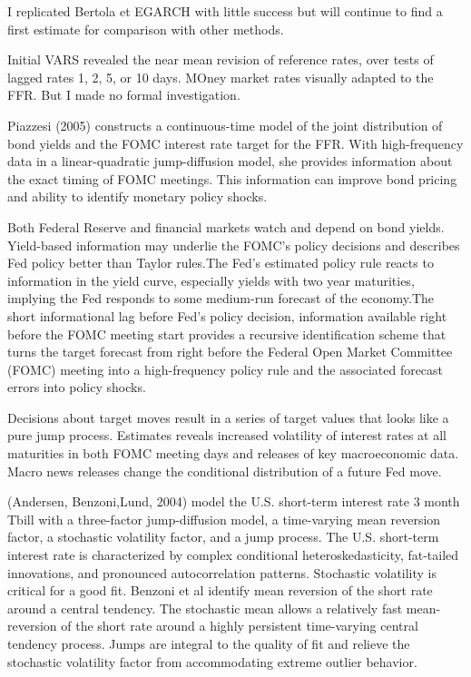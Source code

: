 \documentclass[
]{article}
\begin{document}
I replicated Bertola et EGARCH with little success but will continue to find a first estimate for comparison with other methods.

Initial VARS revealed the near mean revision of reference rates, over tests of lagged rates 1, 2, 5, or 10 days. MOney market rates visually adapted to the FFR. But I made no formal investigation.

Piazzesi (2005) constructs a continuous-time model of the joint distribution of bond yields and the FOMC interest rate target for the FFR. With high-frequency data in a linear-quadratic jump-diffusion model, she provides information about the exact timing of FOMC meetings. This information can improve bond pricing and ability to identify monetary policy shocks.

Both Federal Reserve and financial markets watch and depend on bond yields. Yield-based information may underlie the FOMC's policy decisions and describes Fed policy better than Taylor rules.The Fed's estimated policy rule reacts to information in the yield curve, especially yields with two year maturities, implying the Fed responds to some medium-run forecast of the economy.The short informational lag before Fed's policy decision, information available right before the FOMC meeting start provides a recursive identification scheme that turns the target forecast from right before the Federal Open Market Committee (FOMC) meeting into a high-frequency policy rule and the associated forecast errors into policy shocks.

Decisions about target moves result in a series of target values that looks like a pure jump process. Estimates reveals increased volatility of interest rates at all maturities in both FOMC meeting days and releases of key macroeconomic data. Macro news releases change the conditional distribution of a future Fed move.

(Andersen, Benzoni,Lund, 2004) model the U.S. short-term interest rate 3 month Tbill with a three-factor jump-diffusion model, a time-varying mean reversion factor, a stochastic volatility factor, and a jump process. The U.S. short-term interest rate is characterized by complex conditional heteroskedasticity, fat-tailed innovations, and pronounced autocorrelation patterns. Stochastic volatility is critical for a good fit. Benzoni et al identify mean reversion of the short rate around a central tendency. The stochastic mean allows a relatively fast mean-reversion of the short rate around a highly persistent time-varying central tendency process. Jumps are integral to the quality of fit and relieve the stochastic volatility factor from accommodating extreme outlier behavior.
\end{document}
